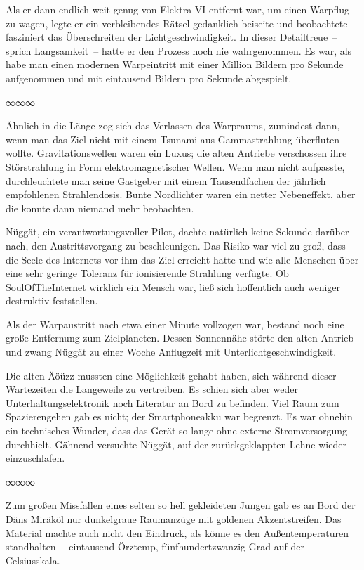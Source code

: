 Als er dann endlich weit genug von Elektra VI entfernt war, um einen Warpflug zu wagen, legte er ein verbleibendes Rätsel gedanklich beiseite und beobachtete fasziniert das Überschreiten der Lichtgeschwindigkeit. In dieser Detailtreue~– sprich Langsamkeit~– hatte er den Prozess noch nie wahrgenommen. Es war, als habe man einen modernen Warpeintritt mit einer Million Bildern pro Sekunde aufgenommen und mit eintausend Bildern pro Sekunde abgespielt.

\begin{center}
∞∞∞
\end{center}

Ähnlich in die Länge zog sich das Verlassen des Warpraums, zumindest dann, wenn man das Ziel nicht mit einem Tsunami aus Gammastrahlung überfluten wollte. Gravitationswellen waren ein Luxus; die alten Antriebe verschossen ihre Störstrahlung in Form elektromagnetischer Wellen. Wenn man nicht aufpasste, durchleuchtete man seine Gastgeber mit einem Tausendfachen der jährlich empfohlenen Strahlendosis. Bunte Nordlichter waren ein netter Nebeneffekt, aber die konnte dann niemand mehr beobachten.

Nüggät, ein verantwortungsvoller Pilot, dachte natürlich keine Sekunde darüber nach, den Austrittsvorgang zu beschleunigen. Das Risiko war viel zu groß, dass die Seele des Internets vor ihm das Ziel erreicht hatte und wie alle Menschen über eine sehr geringe Toleranz für ionisierende Strahlung verfügte. Ob SoulOfTheInternet wirklich ein Mensch war, ließ sich hoffentlich auch weniger destruktiv feststellen.

Als der Warpaustritt nach etwa einer Minute vollzogen war, bestand noch eine große Entfernung zum Zielplaneten. Dessen Sonnennähe störte den alten Antrieb und zwang Nüggät zu einer Woche Anflugzeit mit Unterlichtgeschwindigkeit.

Die alten Äöüzz mussten eine Möglichkeit gehabt haben, sich während dieser Wartezeiten die Langeweile zu vertreiben. Es schien sich aber weder Unterhaltungselektronik noch Literatur an Bord zu befinden. Viel Raum zum Spazierengehen gab es nicht; der Smartphoneakku war begrenzt. Es war ohnehin ein technisches Wunder, dass das Gerät so lange ohne externe Stromversorgung durchhielt. Gähnend versuchte Nüggät, auf der zurückgeklappten Lehne wieder einzuschlafen.

\begin{center}
∞∞∞
\end{center}

Zum großen Missfallen eines selten so hell gekleideten Jungen gab es an Bord der Däns Miräköl nur dunkelgraue Raumanzüge mit goldenen Akzentstreifen. Das Material machte auch nicht den Eindruck, als könne es den Außentemperaturen standhalten~– eintausend Örztemp, fünfhundertzwanzig Grad auf der Celsiusskala.


